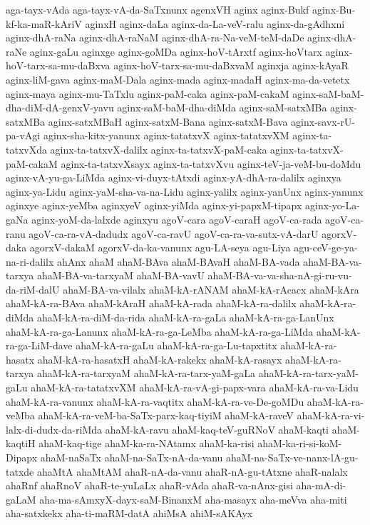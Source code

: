 {aga-tayx-vAda
aga-tayx-vA-da-SaTxnunx
agenxVH
aginx
aginx-Bukf
aginx-Bu-kf-ka-maR-kAriV
aginxH
aginx-daLa
aginx-da-La-veV-ralu
aginx-da-gAdhxni
aginx-dhA-raNa
aginx-dhA-raNaM
aginx-dhA-ra-Na-veM-teM-daDe
aginx-dhA-raNe
aginx-gaLu
aginxge
aginx-goMDa
aginx-hoV-tArxtf
aginx-hoVtarx
aginx-hoV-tarx-sa-mu-daBxva
aginx-hoV-tarx-sa-mu-daBxvaM
aginxja
aginx-kAyaR
aginx-liM-gava
aginx-maM-Dala
aginx-mada
aginx-madaH
aginx-ma-da-vetetx
aginx-maya
aginx-mu-TaTxlu
aginx-paM-caka
aginx-paM-cakaM
aginx-saM-baM-dha-diM-dA-genxV-yavu
aginx-saM-baM-dha-diMda
aginx-saM-satxMBa
aginx-satxMBa
aginx-satxMBaH
aginx-satxM-Bana
aginx-satxM-Bava
aginx-savx-rU-pa-vAgi
aginx-sha-kitx-yanunx
aginx-tatatxvX
aginx-tatatxvXM
aginx-ta-tatxvXda
aginx-ta-tatxvX-dalilx
aginx-ta-tatxvX-paM-caka
aginx-ta-tatxvX-paM-cakaM
aginx-ta-tatxvXsayx
aginx-ta-tatxvXvu
aginx-teV-ja-veM-bu-doMdu
aginx-vA-yu-ga-LiMda
aginx-vi-duyx-tAtxdi
aginx-yA-dhA-ra-dalilx
aginxya
aginx-ya-Lidu
aginx-yaM-sha-va-na-Lidu
aginx-yalilx
aginx-yanUnx
aginx-yanunx
aginxye
aginx-yeMba
aginxyeV
aginx-yiMda
aginx-yi-papxM-tipapx
aginx-yo-La-gaNa
aginx-yoM-da-lalxde
aginxyu
agoV-cara
agoV-caraH
agoV-ca-rada
agoV-ca-ranu
agoV-ca-ra-vA-dadudx
agoV-ca-ravU
agoV-ca-ra-va-sutx-vA-darU
agorxV-daka
agorxV-dakaM
agorxV-da-ka-vanunx
agu-LA-seya
agu-Liya
agu-ceV-ge-ya-na-ri-dalilx
ahAnx
ahaM
ahaM-BAva
ahaM-BAvaH
ahaM-BA-vada
ahaM-BA-va-tarxya
ahaM-BA-va-tarxyaM
ahaM-BA-vavU
ahaM-BA-va-va-sha-nA-gi-ru-vu-da-riM-dalU
ahaM-BA-va-vilalx
ahaM-kA-rANAM
ahaM-kA-rAcacx
ahaM-kAra
ahaM-kA-ra-BAva
ahaM-kAraH
ahaM-kA-rada
ahaM-kA-ra-dalilx
ahaM-kA-ra-diMda
ahaM-kA-ra-diM-da-rida
ahaM-kA-ra-gaLa
ahaM-kA-ra-ga-LanUnx
ahaM-kA-ra-ga-Lanunx
ahaM-kA-ra-ga-LeMba
ahaM-kA-ra-ga-LiMda
ahaM-kA-ra-ga-LiM-dave
ahaM-kA-ra-gaLu
ahaM-kA-ra-ga-Lu-tapxtitx
ahaM-kA-ra-hasatx
ahaM-kA-ra-hasatxH
ahaM-kA-rakekx
ahaM-kA-rasayx
ahaM-kA-ra-tarxya
ahaM-kA-ra-tarxyaM
ahaM-kA-ra-tarx-yaM-gaLa
ahaM-kA-ra-tarx-yaM-gaLu
ahaM-kA-ra-tatatxvXM
ahaM-kA-ra-vA-gi-papx-vara
ahaM-kA-ra-va-Lidu
ahaM-kA-ra-vanunx
ahaM-kA-ra-vaqtitx
ahaM-kA-ra-ve-De-goMDu
ahaM-kA-ra-veMba
ahaM-kA-ra-veM-ba-SaTx-parx-kaq-tiyiM
ahaM-kA-raveV
ahaM-kA-ra-vi-lalx-di-dudx-da-riMda
ahaM-kA-ravu
ahaM-kaq-teV-guRNoV
ahaM-kaqti
ahaM-kaqtiH
ahaM-kaq-tige
ahaM-ka-ra-NAtamx
ahaM-ka-risi
ahaM-ka-ri-si-koM-Dipapx
ahaM-naSaTx
ahaM-na-SaTx-nA-da-vanu
ahaM-na-SaTx-ve-nanx-lA-gu-tatxde
ahaMtA
ahaMtAM
ahaR-nA-da-vanu
ahaR-nA-gu-tAtxne
ahaR-nalalx
ahaRnf
ahaRnoV
ahaR-te-yuLaLx
ahaR-vAda
ahaR-va-nAnx-gisi
aha-mA-di-gaLaM
aha-ma-sAmxyX-dayx-saM-BinanxM
aha-masayx
aha-meVva
aha-miti
aha-satxkekx
aha-ti-maRM-datA
ahiMsA
ahiM-sAKAyx
}
